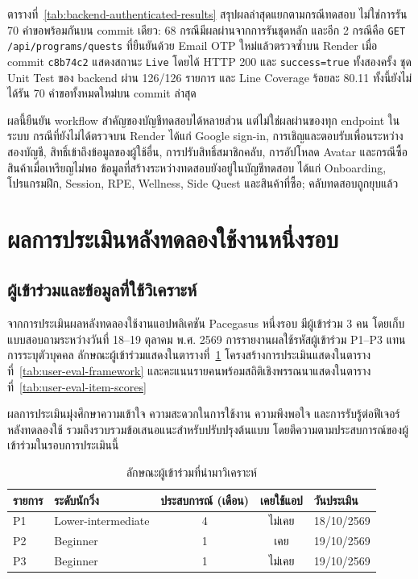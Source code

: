 ตารางที่~\ref{tab:backend-authenticated-results} สรุปผลล่าสุดแยกตามกรณีทดสอบ ไม่ใช่การรัน 70 คำขอพร้อมกันบน commit เดียว: 68 กรณีมีผลผ่านจากการรันชุดหลัก และอีก 2 กรณีคือ \texttt{GET /api/programs/quests} ที่ยืนยันด้วย Email OTP ใหม่แล้วตรวจซ้ำบน Render เมื่อ commit \texttt{c8b74c2} แสดงสถานะ \texttt{Live} โดยได้ HTTP 200 และ \texttt{success=true} ทั้งสองครั้ง ชุด Unit Test ของ backend ผ่าน 126/126 รายการ และ Line Coverage ร้อยละ 80.11 ทั้งนี้ยังไม่ได้รัน 70 คำขอทั้งหมดใหม่บน commit ล่าสุด

ผลนี้ยืนยัน workflow สำคัญของบัญชีทดสอบได้หลายส่วน แต่ไม่ใช่ผลผ่านของทุก endpoint ในระบบ กรณีที่ยังไม่ได้ตรวจบน Render ได้แก่ Google sign-in, การเชิญและตอบรับเพื่อนระหว่างสองบัญชี, สิทธิ์เข้าถึงข้อมูลของผู้ใช้อื่น, การปรับสิทธิ์สมาชิกคลับ, การอัปโหลด Avatar และกรณีซื้อสินค้าเมื่อเหรียญไม่พอ ข้อมูลที่สร้างระหว่างทดสอบยังอยู่ในบัญชีทดสอบ ได้แก่ Onboarding, โปรแกรมฝึก, Session, RPE, Wellness, Side Quest และสินค้าที่ซื้อ; คลับทดสอบถูกยุบแล้ว



\section{ผลการประเมินหลังทดลองใช้งานหนึ่งรอบ}
\label{sec:single-session-results}

\subsection{ผู้เข้าร่วมและข้อมูลที่ใช้วิเคราะห์}

จากการประเมินผลหลังทดลองใช้งานแอปพลิเคชัน Pacegasus หนึ่งรอบ มีผู้เข้าร่วม 3 คน โดยเก็บแบบสอบถามระหว่างวันที่ 18--19 ตุลาคม พ.ศ. 2569 การรายงานผลใช้รหัสผู้เข้าร่วม P1--P3 แทนการระบุตัวบุคคล ลักษณะผู้เข้าร่วมแสดงในตารางที่~\ref{tab:user-eval-participants} โครงสร้างการประเมินแสดงในตารางที่~\ref{tab:user-eval-framework} และคะแนนรายคนพร้อมสถิติเชิงพรรณนาแสดงในตารางที่~\ref{tab:user-eval-item-scores}

ผลการประเมินมุ่งศึกษาความเข้าใจ ความสะดวกในการใช้งาน ความพึงพอใจ และการรับรู้ต่อฟีเจอร์หลังทดลองใช้ รวมถึงรวบรวมข้อเสนอแนะสำหรับปรับปรุงต้นแบบ โดยตีความตามประสบการณ์ของผู้เข้าร่วมในรอบการประเมินนี้

\begin{table}[H]
\centering\small
\caption{ลักษณะผู้เข้าร่วมที่นำมาวิเคราะห์}\label{tab:user-eval-participants}
\begin{tabular}{|l|l|c|c|l|}\hline
\textbf{รายการ} & \textbf{ระดับนักวิ่ง} & \textbf{ประสบการณ์ (เดือน)} & \textbf{เคยใช้แอป} & \textbf{วันประเมิน} \\ \hline
P1 & Lower-intermediate & 4 & ไม่เคย & 18/10/2569 \\ \hline
P2 & Beginner & 1 & เคย & 19/10/2569 \\ \hline
P3 & Beginner & 1 & ไม่เคย & 19/10/2569 \\ \hline
\end{tabular}
\end{table}

